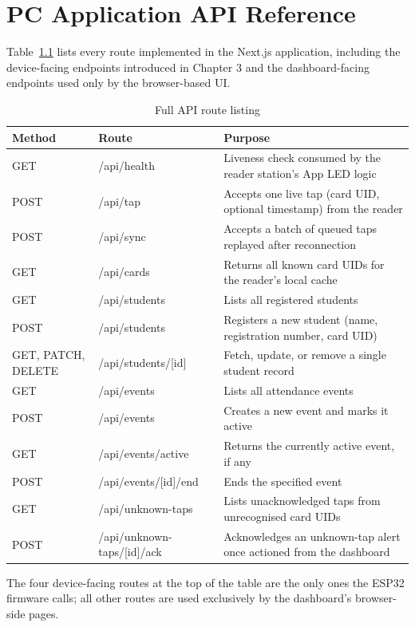\chapter{PC Application API Reference}
\label{app:api}

Table~\ref{tab:full-api} lists every route implemented in the Next.js application, including the device-facing endpoints introduced in Chapter 3 and the dashboard-facing endpoints used only by the browser-based UI.

\begin{table}[H]
    \centering
    \caption{Full API route listing}
    \label{tab:full-api}
    \begin{tabular}{@{}p{2.4cm}p{4.3cm}p{6.3cm}@{}}
        \toprule
        \textbf{Method} & \textbf{Route} & \textbf{Purpose} \\
        \midrule
        GET & /api/health & Liveness check consumed by the reader station's App LED logic \\
        POST & /api/tap & Accepts one live tap (card UID, optional timestamp) from the reader \\
        POST & /api/sync & Accepts a batch of queued taps replayed after reconnection \\
        GET & /api/cards & Returns all known card UIDs for the reader's local cache \\
        GET & /api/students & Lists all registered students \\
        POST & /api/students & Registers a new student (name, registration number, card UID) \\
        GET, PATCH, DELETE & /api/students/[id] & Fetch, update, or remove a single student record \\
        GET & /api/events & Lists all attendance events \\
        POST & /api/events & Creates a new event and marks it active \\
        GET & /api/events/active & Returns the currently active event, if any \\
        POST & /api/events/[id]/end & Ends the specified event \\
        GET & /api/unknown-taps & Lists unacknowledged taps from unrecognised card UIDs \\
        POST & /api/unknown-taps/[id]/ack & Acknowledges an unknown-tap alert once actioned from the dashboard \\
        \bottomrule
    \end{tabular}
\end{table}

The four device-facing routes at the top of the table are the only ones the ESP32 firmware calls; all other routes are used exclusively by the dashboard's browser-side pages.
